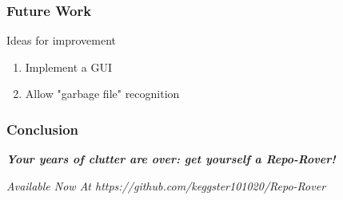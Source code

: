\documentclass{beamer}
\begin{document}






\begin{frame}
    \centering
    \frametitle{Future Work}
    
    \begin{block}{Ideas for improvement}
    		\begin{enumerate}
    			\item Implement a GUI
    			\item Allow "garbage file" recognition
    		\end{enumerate}
    \end{block}
    
\end{frame}


\begin{frame}
    \centering
    \frametitle{Conclusion}
    \begin{block}{}
    \begin{center}
	\emph{\huge{\textbf{Your years of clutter are over: get yourself a Repo-Rover!}}}
    \end{center}
    \end{block}
	\vspace{1.75cm}
    \begin{block}{}
    \begin{center}
    \emph{\Large{Available Now At \emph{https://github.com/keggster101020/Repo-Rover}}}
    \end{center}
    \end{block}
\end{frame}



\begin{frame}
	\centering
	\frametitle{}
	\begin{block}{}
		
	\end{block}
\end{frame}
\end{document}
